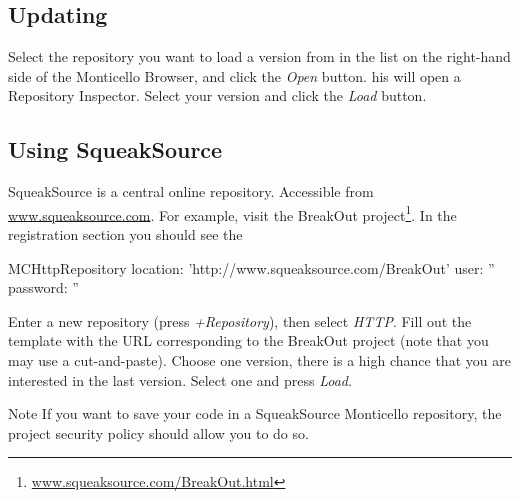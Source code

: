 \documentclass[a4paper,10pt,twoside]{book}
\begin{document}
\subsection{Updating}

Select the repository you want to load a version from in the list on the right-hand side of the Monticello Browser, and click the \emph{Open} button. his will open a Repository Inspector. Select your version and click the \emph{Load} button.


\subsection{Using SqueakSource}

SqueakSource is a central online repository. Accessible from \href{http://www.squeaksource.com}{www.squeaksource.com}. For example, visit the BreakOut project\footnote{\href{http://www.squeaksource.com/BreakOut.html}{www.squeaksource.com/BreakOut.html}}. In the registration section you should see the 

\begin{code}

MCHttpRepository
    location: 'http://www.squeaksource.com/BreakOut'
    user: ''
    password: ''
\end{code}

Enter a new repository (press \emph{+Repository}), then select \emph{HTTP}. Fill out the template with the URL corresponding to the BreakOut project (note that you may use a cut-and-paste). Choose one version, there is a high chance that you are interested in the last version. Select one and press \emph{Load}.

Note If you want to save your code in a SqueakSource Monticello repository, the project security policy should allow you to do so.


\end{document}

